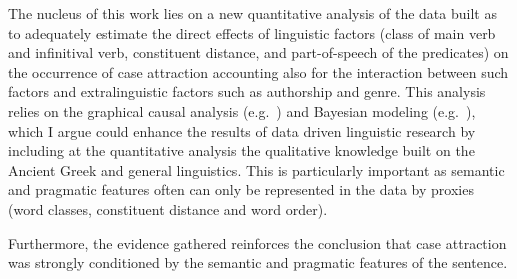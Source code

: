 \documentclass[article,a4paper,12pt]{memoir}
\begin{document}
The nucleus of this work lies on a new quantitative analysis of the data
built as to adequately estimate the direct effects of linguistic factors
(class of main verb and infinitival verb, constituent distance, and
part-of-speech of the predicates) on the occurrence of case attraction
accounting also for the interaction between such factors and
extralinguistic factors such as authorship and genre. This analysis
relies on the graphical causal analysis (e.g.~\cite{Pearl2009})
and Bayesian modeling (e.g.~\cite{McElreath2020}), which I argue could 
enhance the results of data driven linguistic research by including at the 
quantitative analysis the qualitative knowledge built on the Ancient Greek 
and general linguistics. This is particularly important as semantic and
pragmatic features often can only be represented in the data by proxies
(word classes, constituent distance and word order).

Furthermore, the evidence gathered reinforces the conclusion that case
attraction was strongly conditioned by the semantic and pragmatic
features of the sentence.

\printbibliography%
\end{document}
